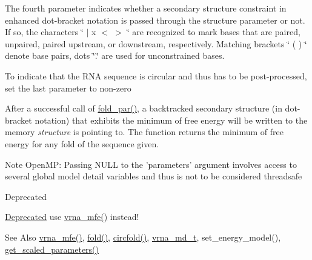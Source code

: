 The fourth parameter indicates whether a secondary structure constraint in enhanced dot-\/bracket notation is passed through the structure parameter or not. If so, the characters \char`\"{} $\vert$ x $<$ $>$ \char`\"{} are recognized to mark bases that are paired, unpaired, paired upstream, or downstream, respectively. Matching brackets \char`\"{} ( ) \char`\"{} denote base pairs, dots \char`\"{}.\char`\"{} are used for unconstrained bases.

To indicate that the R\-N\-A sequence is circular and thus has to be post-\/processed, set the last parameter to non-\/zero

After a successful call of \hyperlink{group__mfe__fold__single_ga2bc41df5d71fee6fd8da9904ee65d8fb}{fold\-\_\-par()}, a backtracked secondary structure (in dot-\/bracket notation) that exhibits the minimum of free energy will be written to the memory {\itshape structure} is pointing to. The function returns the minimum of free energy for any fold of the sequence given.

\begin{DoxyNote}{Note}
Open\-M\-P\-: Passing N\-U\-L\-L to the 'parameters' argument involves access to several global model detail variables and thus is not to be considered threadsafe
\end{DoxyNote}
\begin{DoxyRefDesc}{Deprecated}
\item[\hyperlink{deprecated__deprecated000063}{Deprecated}]use \hyperlink{group__mfe__fold_gabd3b147371ccf25c577f88bbbaf159fd}{vrna\-\_\-mfe()} instead!\end{DoxyRefDesc}


\begin{DoxySeeAlso}{See Also}
\hyperlink{group__mfe__fold_gabd3b147371ccf25c577f88bbbaf159fd}{vrna\-\_\-mfe()}, \hyperlink{group__mfe__fold__single_gaadafcb0f140795ae62e5ca027e335a9b}{fold()}, \hyperlink{group__mfe__fold__single_ga4ac63ab3e8d9a80ced28b8052d94e423}{circfold()}, \hyperlink{group__model__details_ga1f8a10e12a0a1915f2a4eff0b28ea17c}{vrna\-\_\-md\-\_\-t}, set\-\_\-energy\-\_\-model(), \hyperlink{group__energy__parameters_ga7fa6a000d7c16feab939f2c4ee626197}{get\-\_\-scaled\-\_\-parameters()}
\end{DoxySeeAlso}

